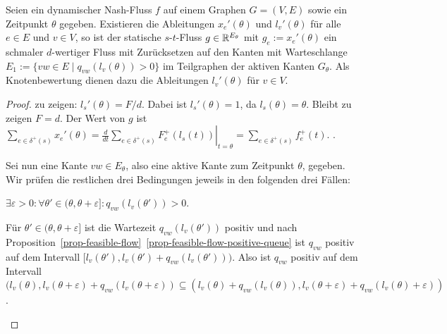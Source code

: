 \begin{theorem}
	Seien ein dynamischer Nash-Fluss $f$ auf einem Graphen $G=(V,E)$ sowie ein Zeitpunkt $\theta$ gegeben.	
	Existieren die Ableitungen $x_e'(\theta)$ und $l_v'(\theta)$ für alle $e\in E$ und $v\in V$, so ist der statische $s$-$t$-Fluss $g\in\mathbb{R}^{E_\theta}$ mit $g_e:=x_e'(\theta)$ ein schmaler $d$-wertiger Fluss mit Zurücksetzen auf den Kanten mit Warteschlange $E_1:=\{vw\in E \mid q_{vw}(l_v(\theta))>0 \}$ im Teilgraphen der aktiven Kanten $G_\theta$.
	Als Knotenbewertung dienen dazu die Ableitungen $l_v'(\theta)$ für $v\in V$.
\end{theorem}
\begin{proof}
	zu zeigen: $l_s'(\theta) = F/d$.
	Dabei ist $l_s'(\theta) = 1$, da $l_s(\theta) = \theta$. Bleibt zu zeigen $F= d$.
	Der Wert von $g$ ist $\sum_{e\in\delta^+(s)}x_e'(\theta) =  \left.\frac{d}{dt}\sum_{e\in\delta^+(s)}F_e^+(l_s(t))\right|_{t=\theta} = \sum_{e\in\delta^+(s)} f_e^+(t)$. .
		
	Sei nun eine Kante $vw\in E_\theta$, also eine aktive Kante zum Zeitpunkt $\theta$, gegeben. Wir prüfen die restlichen drei Bedingungen jeweils in den folgenden drei Fällen:
	
	\begin{description}[leftmargin=0cm, topsep=0cm, itemindent=0.5cm]
		\item[1. Fall:] $\exists \varepsilon > 0:\forall \theta'\in (\theta, \theta + \varepsilon ] : q_{vw}(l_v(\theta')) > 0$.
		
		Für $\theta'\in(\theta,\theta+\varepsilon]$ ist die Wartezeit $q_{vw}(l_v(\theta'))$ positiv und nach Proposition~\ref{prop-feasible-flow}~\ref{prop-feasible-flow-positive-queue} ist $q_{vw}$ positiv auf dem Intervall $[ l_v(\theta') , l_v(\theta')+q_{vw}(l_v(\theta')) )$.
		Also ist $q_{vw}$ positiv auf dem Intervall $( l_v(\theta) , l_v(\theta + \varepsilon) + q_{vw}(l_v(\theta + \varepsilon) )
		\subseteq ( l_v(\theta) + q_{vw}(l_v(\theta)) , l_v(\theta + \varepsilon) + q_{vw}(l_v(\theta) + \varepsilon ) )$.
		

\end{description}
\end{proof}
